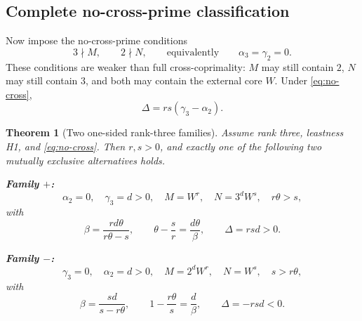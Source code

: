 \documentclass[11pt,oneside]{article}
\theoremstyle{research}
\newtheorem{theorem}{Theorem}[section]
\theoremstyle{definition}
\begin{document}
\subsection{Complete no-cross-prime classification}
\label{sec:no-cross}

Now impose the no-cross-prime conditions
\begin{equation}
 3\nmid M,
 \qquad
 2\nmid N,
 \qquad\text{equivalently}\qquad
 \alpha_3=\gamma_2=0.
 \label{eq:no-cross}
\end{equation}
These conditions are weaker than full cross-coprimality: $M$ may still contain
$2$, $N$ may still contain $3$, and both may contain the external core $W$.
Under \eqref{eq:no-cross},
\begin{equation}
 \Delta=rs(\gamma_3-\alpha_2).
 \label{eq:Delta-no-cross}
\end{equation}

\begin{theorem}[Two one-sided rank-three families]
\label{thm:no-cross-classification}
Assume rank three, leastness H1, and \eqref{eq:no-cross}.  Then $r,s>0$, and
exactly one of the following two mutually exclusive alternatives holds.

\medskip
\noindent\textbf{Family $+$:}
\begin{equation}
 \alpha_2=0,
 \quad \gamma_3=d>0,
 \quad M=W^r,
 \quad N=3^dW^s,
 \quad r\theta>s,
 \label{eq:family-plus}
\end{equation}
with
\begin{equation}
 \beta=\frac{rd\theta}{r\theta-s},
 \qquad
 \theta-\frac sr=\frac{d\theta}{\beta},
 \qquad
 \Delta=rsd>0.
 \label{eq:family-plus-formulas}
\end{equation}

\medskip
\noindent\textbf{Family $-$:}
\begin{equation}
 \gamma_3=0,
 \quad \alpha_2=d>0,
 \quad M=2^dW^r,
 \quad N=W^s,
 \quad s>r\theta,
 \label{eq:family-minus}
\end{equation}
with
\begin{equation}
 \beta=\frac{sd}{s-r\theta},
 \qquad
 1-\frac{r\theta}{s}=\frac d\beta,
 \qquad
 \Delta=-rsd<0.
 \label{eq:family-minus-formulas}
\end{equation}
\end{theorem}
\end{document}
